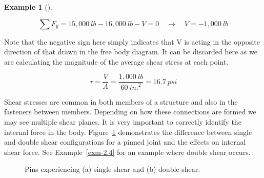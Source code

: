 \documentclass[
  letterpaper,
  DIV=11,
  numbers=noendperiod]{scrreprt}
\theoremstyle{definition}
\newtheorem{example}{Example}[chapter]
\theoremstyle{remark}
\begin{document}
\begin{tcolorbox}
\begin{example}[]
\begin{tcolorbox}
\[
\sum F_y=15,000{~lb}-16,000{~lb}-V=0 \quad \rightarrow \quad V=-1,000{~lb}
\]

Note that the negative sign here simply indicates that V is acting in
the opposite direction of that drawn in the free body diagram. It can be
discarded here as we are calculating the magnitude of the average shear
stress at each point.

\[
\tau=\frac{V}{A}=\frac{1,000{~lb}}{60{~in.}^2}=16.7{~psi}
\]

\end{tcolorbox}

\end{example}

\end{tcolorbox}

Shear stresses are common in both members of a structure and also in the
fasteners between members. Depending on how these connections are formed
we may see multiple shear planes. It is very important to correctly
identify the internal force in the body. Figure~\ref{fig-2.4}
demonstrates the difference between single and double shear
configurations for a pinned joint and the effects on internal shear
force. See Example~\ref{exm-2.4} for an example where double shear
occurs.

\begin{figure}


\caption{\label{fig-2.4}Pins experiencing (a) single shear and (b)
double shear.}

\end{figure}%
\end{document}
